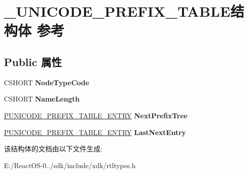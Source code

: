 \hypertarget{struct___u_n_i_c_o_d_e___p_r_e_f_i_x___t_a_b_l_e}{}\section{\+\_\+\+U\+N\+I\+C\+O\+D\+E\+\_\+\+P\+R\+E\+F\+I\+X\+\_\+\+T\+A\+B\+L\+E结构体 参考}
\label{struct___u_n_i_c_o_d_e___p_r_e_f_i_x___t_a_b_l_e}
\subsection*{Public 属性}
\begin{DoxyCompactItemize}
\item 
\mbox{\label{struct___u_n_i_c_o_d_e___p_r_e_f_i_x___t_a_b_l_e_a747943d0d85f53e0dc9091d8e9b66fb2}} 
C\+S\+H\+O\+RT {\bfseries Node\+Type\+Code}
\item 
\mbox{\label{struct___u_n_i_c_o_d_e___p_r_e_f_i_x___t_a_b_l_e_a17e2523726234ada732f5941aec0411b}} 
C\+S\+H\+O\+RT {\bfseries Name\+Length}
\item 
\mbox{\label{struct___u_n_i_c_o_d_e___p_r_e_f_i_x___t_a_b_l_e_ae5586d3dd6bed378dc20b36c339b8908}} 
\hyperlink{struct___u_n_i_c_o_d_e___p_r_e_f_i_x___t_a_b_l_e___e_n_t_r_y}{P\+U\+N\+I\+C\+O\+D\+E\+\_\+\+P\+R\+E\+F\+I\+X\+\_\+\+T\+A\+B\+L\+E\+\_\+\+E\+N\+T\+RY} {\bfseries Next\+Prefix\+Tree}
\item 
\mbox{\label{struct___u_n_i_c_o_d_e___p_r_e_f_i_x___t_a_b_l_e_a1d5054c1e27480393cc69711ae72488e}} 
\hyperlink{struct___u_n_i_c_o_d_e___p_r_e_f_i_x___t_a_b_l_e___e_n_t_r_y}{P\+U\+N\+I\+C\+O\+D\+E\+\_\+\+P\+R\+E\+F\+I\+X\+\_\+\+T\+A\+B\+L\+E\+\_\+\+E\+N\+T\+RY} {\bfseries Last\+Next\+Entry}
\end{DoxyCompactItemize}


该结构体的文档由以下文件生成\+:\begin{DoxyCompactItemize}
\item 
E\+:/\+React\+O\+S-\/0../sdk/include/xdk/rtltypes.\+h\end{DoxyCompactItemize}
